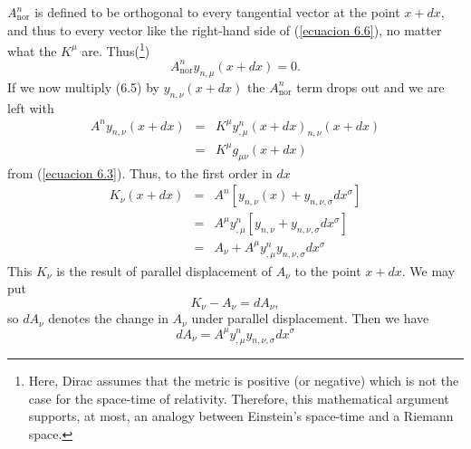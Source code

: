 $A^n_{\mbox{nor}}$ is defined to be orthogonal to every tangential vector at 
the point $x+dx$, and thus to every vector like the right-hand side of 
(\ref{ecuacion 6.6}), no matter what the $K^\mu$ are. Thus(\footnote{Here, Dirac 
assumes that the metric is positive (or negative) which is not the case for the 
space-time of relativity. Therefore, this mathematical argument supports, at 
most, an analogy between Einstein's space-time and a Riemann space.})
\[
 A^n_{\mbox{nor}} y_{n,\mu}(x + dx) = 0.
\]
If we now multiply (6.5) by $y_{n,\nu} (x+dx)$ the $A^n_{\mbox{nor}}$ term 
drops out and we are left with
\[
 \begin{array}{rcl}
  A^n y_{n,\nu}(x + dx ) & = & K^\mu y^n_{,\mu}(x+dx)_{n,\nu}(x + dx)\\
                         & = & K^\mu g_{\mu\nu}(x + dx)
 \end{array}
\]
from (\ref{ecuacion 6.3}). Thus, to the first order in $dx$
\[
 \begin{array}{rcl}
  K_{\nu}(x + dx) & = & A^n\left[ y_{n,\nu}(x) + y_{n,\nu,\sigma} dx^\sigma \right]\\
                  & = & A^\mu y^n_{,\mu} \left[ y_{n,\nu} + y_{n,\nu,\sigma} d x^\sigma \right]\\
                  & = & A_\nu + A^\mu y^n_{,\mu} y_{n,\nu,\sigma} d x^\sigma
 \end{array}
\]
This $K_\nu$ is the result of parallel displacement of $A_\nu$ to the point $x+ 
dx$. We may put
\[
 K_\nu - A_\nu = d A_\nu,
\]
so $dA_\nu$ denotes the change in $A_\nu$ under parallel displacement. Then we 
have
\begin{equation}
 \label{ecuacion 6.7}
 d A_\nu = A^\mu y^n_{,\mu} y_{n,\nu,\sigma} d x^\sigma
\end{equation}


